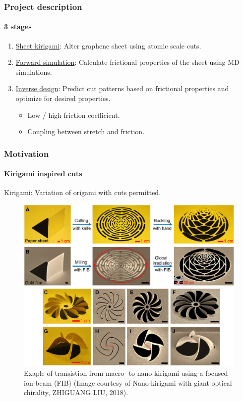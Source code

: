 \documentclass[
	10pt, %
]{beamer}
\begin{document}
\begin{frame}
	\frametitle{Project description}
	\framesubtitle{3 stages}


	\begin{enumerate}
		\setlength\itemsep{2em}
		\item \underline{Sheet kirigami}: Alter graphene sheet using atomic scale cuts. %
		\item \underline{Forward simulation}: Calculate frictional properties of the sheet using MD simulations.
		\item \underline{Inverse design}: Predict cut patterns based on frictional properties and optimize for desired properties.
		\begin{itemize}
			\item Low / high friction coefficient.
			\item Coupling between stretch and friction.
		\end{itemize} 
	

	\end{enumerate}

	
\end{frame}

\begin{frame}
	\frametitle{Motivation}
	\framesubtitle{Kirigami inspired cuts}

	Kirigami: Variation of origami with cuts permitted.

	\begin{figure}
		\includegraphics[width=0.6\linewidth]{figures/kirigami_example.jpeg}
		\caption{Exaple of transistion from macro- to nano-kirigami using a focused ion-beam (FIB) (Image courtesy of Nano-kirigami with giant optical chirality, ZHIGUANG LIU, 2018).}
	\end{figure}	

\end{frame}
\end{document}
